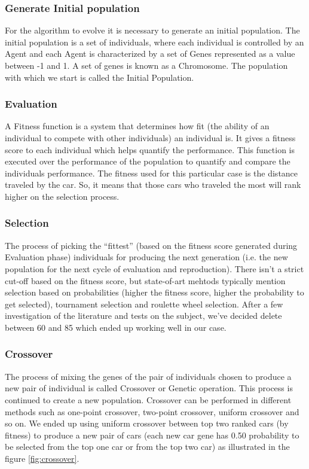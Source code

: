 \documentclass[conference]{IEEEtran}
\begin{document}
\subsubsection{Generate Initial population}
For the algorithm to evolve it is necessary to generate an initial population. The initial population is a set of individuals,
where each individual is controlled by an Agent and each Agent is characterized by a set of Genes represented as a value between
-1 and 1. A set of genes is known as a Chromosome. The population with which we start is called the Initial Population.

\subsubsection{Evaluation}
A Fitness function is a system that determines how fit (the ability of an individual to compete with other individuals)
an individual is. It gives a fitness score to each individual which helps quantify the performance.
This function is executed over the performance of the population to quantify and compare the individuals performance.
The fitness used for this particular case is the distance traveled by the car. So, it means that those cars who traveled
the most will rank higher on the selection process.

\subsubsection{Selection}
The process of picking the “fittest” (based on the fitness score generated during Evaluation phase) individuals for
producing the next generation (i.e. the new population for the next cycle of evaluation and reproduction). There isn’t
a strict cut-off based on the fitness score, but state-of-art mehtods typically mention selection based on probabilities
(higher the fitness score, higher the probability to get selected), tournament selection and roulette wheel selection.
After a few investigation of the literature and tests on the subject, we’ve decided delete between 60 and 85%
which ended up working well in our case.

\subsubsection{Crossover}
The process of mixing the genes of the pair of individuals chosen to produce a new pair of individual is called
Crossover or Genetic operation. This process is continued to create a new population. Crossover can be performed in
different methods such as one-point crossover, two-point crossover, uniform crossover and so on.
We ended up using uniform crossover between top two ranked cars (by fitness) to produce a new pair of cars (each new car gene
has 0.50 probability to be selected from the top one car or from the top two car) as illustrated in the figure \ref{fig:crossover}.
\end{document}
